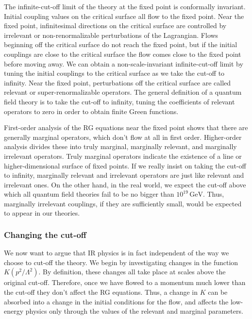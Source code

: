 The infinite-cut-off limit of the theory at the fixed point is conformally
invariant. Initial coupling values on the critical surface all flow to the
fixed point. Near the fixed point, infinitesimal directions on the critical
surface are controlled by irrelevant or non-renormalizable perturbations of the
Lagrangian. Flows beginning off the critical surface do not reach the fixed
point, but if the initial couplings are close to the critical surface the flow
comes close to the fixed point before moving away. We can obtain a
non-scale-invariant infinite-cut-off limit by tuning the initial couplings to
the critical surface as we take the cut-off to infinity. Near the fixed point,
perturbations off the critical surface are called relevant or
super-renormalizable operators. The general definition of a quantum field
theory is to take the cut-off to infinity, tuning the coefficients of relevant
operators to zero in order to obtain finite Green functions.

First-order analysis of the RG equations near the fixed point shows that
there are generally marginal operators, which don't flow at all in first
order. Higher-order analysis divides these into truly marginal, marginally
relevant, and marginally irrelevant operators. Truly marginal operators
indicate the existence of a line or higher-dimensional surface of fixed points.
If we really insist on taking the cut-off to infinity, marginally relevant and
irrelevant operators are just like relevant and irrelevant ones. On the other
hand, in the real world, we expect the cut-off above which all quantum field
theories fail to be no bigger than $10^{19}\,\mathrm{GeV}$. Thus, marginally
irrelevant couplings, if they are sufficiently small, would be expected to
appear in our theories.

\subsubsection{Changing the cut-off}

We now want to argue that IR physics is in fact independent of the way we
choose to cut-off the theory. We begin by investigating changes in the
function $K(p^2/\Lambda^2)$. By definition, these changes all take place at
scales above the original cut-off. Therefore, once we have flowed to a momentum
much lower than the cut-off they don't affect the RG equations. Thus, a change
in $K$ can be absorbed into a change in the initial conditions for the flow,
and affects the low-energy physics only through the values of the relevant and
marginal parameters.

